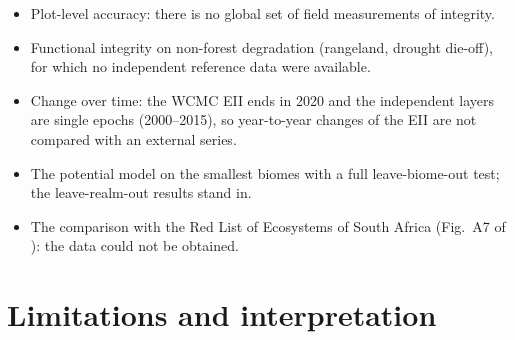 \documentclass[11pt,a4paper]{article}
\begin{document}
\begin{itemize}
\item Plot-level accuracy: there is no global set of field measurements of integrity.
\item Functional integrity on non-forest degradation (rangeland, drought die-off), for which no
independent reference data were available.
\item Change over time: the WCMC EII ends in 2020 and the independent layers are single epochs
(2000--2015), so year-to-year changes of the EII are not compared with an external series.
\item The potential model on the smallest biomes with a full leave-biome-out test; the
leave-realm-out results stand in.
\item The comparison with the Red List of Ecosystems of South Africa (Fig.~A7 of
\citealp{hill2026}): the data could not be obtained.
\end{itemize}

\section{Limitations and interpretation}
\end{document}
